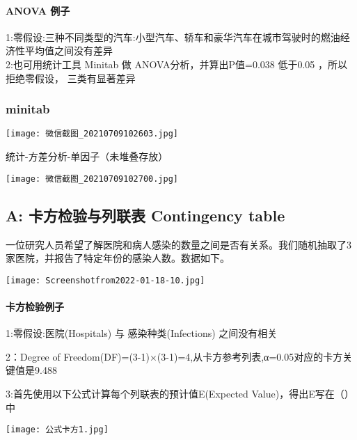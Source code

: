\hypertarget{anova-ux4f8bux5b50}{%
\paragraph{ANOVA 例子}\label{anova-ux4f8bux5b50}}

1:零假设:三种不同类型的汽车:小型汽车、轿车和豪华汽车在城市驾驶时的燃油经济性平均值之间没有差异\\
2:也可用统计工具 Minitab 做 ANOVA分析，并算出P值=0.038 低于0.05
，所以拒绝零假设， 三类有显著差异\\

\hypertarget{minitab-1}{%
\subsubsection{minitab}\label{minitab-1}}


\texttt{[image: 微信截图\_20210709102603.jpg]}

统计-方差分析-单因子（未堆叠存放）


\texttt{[image: 微信截图\_20210709102700.jpg]}

\hypertarget{a-ux5361ux65b9ux68c0ux9a8cux4e0eux5217ux8054ux8868-contingency-table}{%
\subsection{A: 卡方检验与列联表 Contingency
table}\label{a-ux5361ux65b9ux68c0ux9a8cux4e0eux5217ux8054ux8868-contingency-table}}

一位研究人员希望了解医院和病人感染的数量之间是否有关系。我们随机抽取了3家医院，并报告了特定年份的感染人数。数据如下。

\texttt{[image: Screenshotfrom2022-01-18-10.jpg]}

\hypertarget{ux5361ux65b9ux68c0ux9a8cux4f8bux5b50}{%
\paragraph{卡方检验例子}\label{ux5361ux65b9ux68c0ux9a8cux4f8bux5b50}}

1:零假设:医院(Hospitals) 与 感染种类(Infections) 之间没有相关

2：Degree of
Freedom(DF)=(3-1)×(3-1)=4,从卡方参考列表,α=0.05对应的卡方关键值是9.488

3:首先使用以下公式计算每个列联表的预计值E(Expected
Value)，得出E写在（）中


\texttt{[image: 公式卡方1.jpg]}


